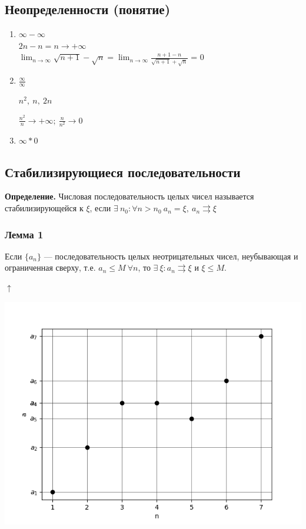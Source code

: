 \documentclass{article}
\begin{document}
    \subsection{Неопределенности (понятие)}
    
    \begin{enumerate}
    	\item \(\infty - \infty\)
    	\\ \(2n - n = n \rightarrow +\infty\)
    	\\ \(\lim_{n \rightarrow \infty}{\sqrt{n+1} - \sqrt{n}} = \lim_{n \rightarrow \infty}{\frac{n+1-n}{\sqrt{n+1}+\sqrt{n}}}\) = 0

    	\item \( \frac{\infty}{\infty} \)

    	\( n^2,\ n,\ 2n \)
    
    	\( \frac{n^2}{n}  \rightarrow +\infty;\ \frac{n}{n^2} \rightarrow 0\)

    	\item \(\infty * 0\)
    \end{enumerate}
    
    \subsection{Стабилизирующиеся последовательности}
    
    \textbf{Определение.}
    Числовая последовательность целых чисел называется стабилизирующейся к \(\xi\), если \( \exists\ n_0 : \forall n > n_0\  a_n = \xi,\ a_n \rightrightarrows \xi \)
    
    \subsubsection{Лемма 1}
    
    Если \(\{a_n\}\) --- последовательность целых неотрицательных чисел, неубывающая и ограниченная сверху, т.е. \( a_n \leq M\ \forall n\), то \( \exists\ \xi: a_n \rightrightarrows \xi \) и \( \xi \leq M \).

    \(\uparrow\)

    \includegraphics[scale=0.6]{8}
    
\end{document}
